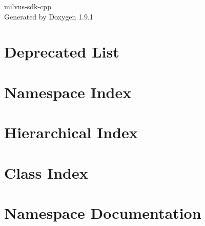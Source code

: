\let\mypdfximage\pdfximage\def\pdfximage{\immediate\mypdfximage}\documentclass[twoside]{book}
\newcommand{\+}{\discretionary{\mbox{\scriptsize$\hookleftarrow$}}{}{}}
\newcommand{\clearemptydoublepage}{%
  \newpage{\pagestyle{empty}\cleardoublepage}%
}
\begin{document}
\raggedbottom

\hypersetup{pageanchor=false,
             bookmarksnumbered=true,
             pdfencoding=unicode
            }
\begin{titlepage}
\vspace*{7cm}
\begin{center}%
{\Large milvus-\/sdk-\/cpp }\\
\vspace*{1cm}
{\large Generated by Doxygen 1.9.1}\\
\end{center}
\end{titlepage}
\clearemptydoublepage
{}
\tableofcontents
\clearemptydoublepage
{}
\hypersetup{pageanchor=true}

\chapter{Deprecated List}
\label{deprecated}

\chapter{Namespace Index}

\chapter{Hierarchical Index}

\chapter{Class Index}

\chapter{Namespace Documentation}

\end{document}
